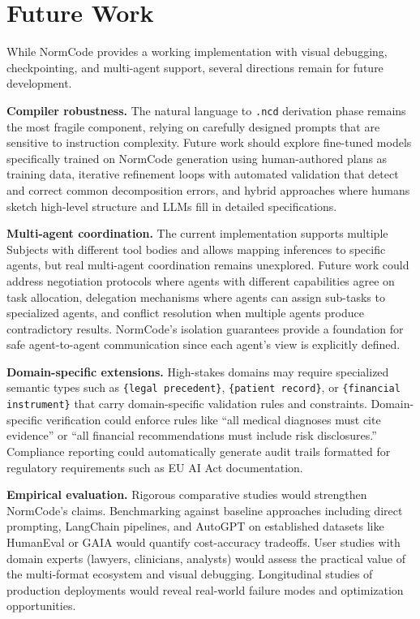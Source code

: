 \section{Future Work}

While NormCode provides a working implementation with visual debugging, checkpointing, and multi-agent support, several directions remain for future development.

\textbf{Compiler robustness.} The natural language to \texttt{.ncd} derivation phase remains the most fragile component, relying on carefully designed prompts that are sensitive to instruction complexity. Future work should explore fine-tuned models specifically trained on NormCode generation using human-authored plans as training data, iterative refinement loops with automated validation that detect and correct common decomposition errors, and hybrid approaches where humans sketch high-level structure and LLMs fill in detailed specifications.

\textbf{Multi-agent coordination.} The current implementation supports multiple Subjects with different tool bodies and allows mapping inferences to specific agents, but real multi-agent coordination remains unexplored. Future work could address negotiation protocols where agents with different capabilities agree on task allocation, delegation mechanisms where agents can assign sub-tasks to specialized agents, and conflict resolution when multiple agents produce contradictory results. NormCode's isolation guarantees provide a foundation for safe agent-to-agent communication since each agent's view is explicitly defined.

\textbf{Domain-specific extensions.} High-stakes domains may require specialized semantic types such as \texttt{\{legal precedent\}}, \texttt{\{patient record\}}, or \texttt{\{financial instrument\}} that carry domain-specific validation rules and constraints. Domain-specific verification could enforce rules like ``all medical diagnoses must cite evidence'' or ``all financial recommendations must include risk disclosures.'' Compliance reporting could automatically generate audit trails formatted for regulatory requirements such as EU AI Act documentation.

\textbf{Empirical evaluation.} Rigorous comparative studies would strengthen NormCode's claims. Benchmarking against baseline approaches including direct prompting, LangChain pipelines, and AutoGPT on established datasets like HumanEval or GAIA would quantify cost-accuracy tradeoffs. User studies with domain experts (lawyers, clinicians, analysts) would assess the practical value of the multi-format ecosystem and visual debugging. Longitudinal studies of production deployments would reveal real-world failure modes and optimization opportunities.


